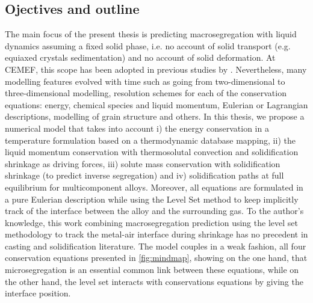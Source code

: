 \subsection{Ojectives and outline}
The main focus of the present thesis is predicting macrosegregation with liquid dynamics assuming a fixed solid phase, i.e. no account of solid 
transport (e.g. equiaxed crystals sedimentation) and no account of solid deformation. At CEMEF, this scope has been adopted in previous 
studies by \citet{gouttebroze_modelisation_2005, liu_finite_2005, mosbah_multiple_2008, rivaux_simulation_2011, carozzani_developpement_2012}.
Nevertheless, many modelling features evolved with time such as going from two-dimensional to three-dimensional modelling, resolution schemes
for each of the conservation equations: energy, chemical species and liquid momentum, Eulerian or Lagrangian descriptions, 
modelling of grain structure and others. In this thesis, we propose a numerical model that takes into account 
i) the energy conservation in a temperature formulation based on a thermodynamic database mapping,
ii) the liquid momentum conservation with thermosolutal convection and solidification shrinkage as driving forces, 
iii) solute mass conservation with solidification shrinkage (to predict inverse segregation) and 
iv) solidification paths at full equilibrium for multicomponent alloys. 
Moreover, all equations are formulated in a pure Eulerian description while using the Level Set method to keep 
implicitly track of the interface between the alloy and the surrounding gas. To the author's knowledge, this work 
combining macrosegregation prediction using the level set methodology to track the metal-air interface during 
shrinkage has no precedent in casting and solidification literature. The model couples in a weak fashion, all four
conservation equations presented in \cref{fig:mindmap}, showing on the one hand, that microsegregation is an essential 
common link between these equations, while on the other hand, the level set interacts with conservations equations by
giving the interface position. 


